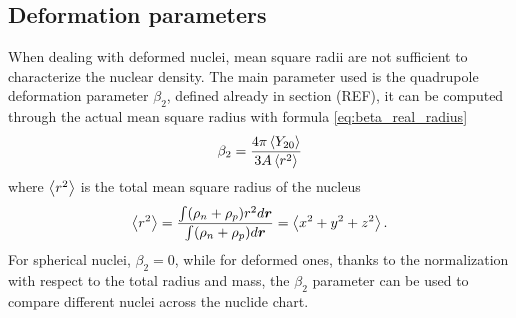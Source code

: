 \subsection{Deformation parameters}
When dealing with deformed nuclei, mean square radii are not sufficient to characterize the nuclear density. The main parameter used is the quadrupole deformation parameter $\beta_2$, defined already in section (REF), it can be computed through the actual mean square radius with formula \ref{eq:beta_real_radius}
\begin{equation}
    \label{eq:beta_real_radius}
    \beta_2 = \frac{4\pi\expval{Y_{2 0}}}{3A\expval{r^2}}
\end{equation}
where $\expval{r^2}$ is the total mean square radius of the nucleus 
\begin{equation}
    \expval{r^2} = \frac{\int (\rho_n + \rho_p )r^2 d\bm r}{\int (\rho_n + \rho_p )d\bm r} = \expval{x^2+y^2+z^2}.
\end{equation}
For spherical nuclei, $\beta_2 = 0$, while for deformed ones, thanks to the normalization with respect to the total radius and mass, the $\beta_2$ parameter can be used to compare different nuclei across the nuclide chart.